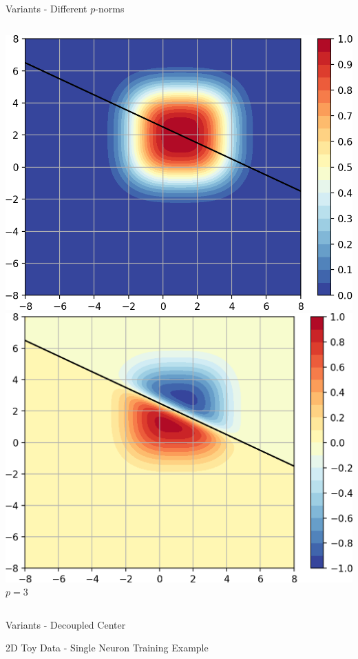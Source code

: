 \documentclass{beamer}
\begin{document}
\begin{frame}{Variants - Different $p$-norms}
\begin{columns}
    \begin{column}{.27\textwidth}
            \includegraphics[width=\textwidth]{images/Variants-Norms/ord3_g-cropped.png}\\
            \includegraphics[width=\textwidth]{images/Variants-Norms/ord3-cropped.png}\\
            \centering $p=3$
    \end{column}
    \end{columns}
\end{frame}


\begin{frame}{Variants - Decoupled Center}
    
\end{frame}

\begin{frame}{2D Toy Data - Single Neuron Training Example}
\end{frame}
\end{document}
